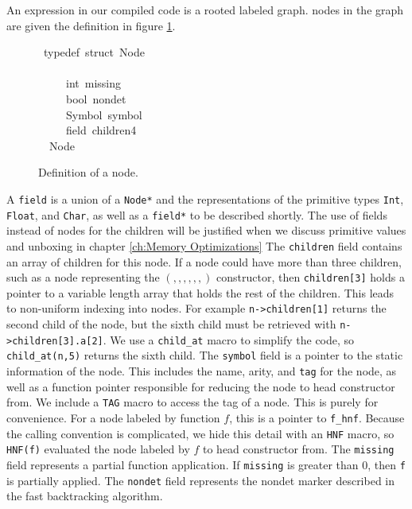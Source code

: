 \documentclass{book}
\theoremstyle{definition}
\newcommand{\Varid}[1]{\mathit{#1}}
\begin{document}
An expression in our compiled code is a rooted labeled graph.
nodes in the graph are given the definition in figure \ref{fig:node}.

\begin{figure}
\begin{tabbing}\ttfamily
~typedef~struct~Node\\
\ttfamily ~\\
\ttfamily ~~~~~int~missing\\
\ttfamily ~~~~~bool~nondet\\
\ttfamily ~~~~~Symbol~symbol\\
\ttfamily ~~~~~field~children4\\
\ttfamily ~~Node
\end{tabbing}
\caption{Definition of a node.}
\label{fig:node}
\end{figure}

A \texttt{field} is a union of a \texttt{Node*} and the representations
of the primitive types \texttt{Int}, \texttt{Float}, and \texttt{Char},
as well as a \texttt{field*} to be described shortly.
The use of fields instead of nodes for the children will be justified when we
discuss primitive values and unboxing in chapter \ref{ch:Memory Optimizations}
The \texttt{children} field contains an array of children for this node.
If a node could have more than three children, such as a node representing
the \ensuremath{(,,,,,,)} constructor, then \texttt{children[3]} holds a pointer
to a variable length array that holds the rest of the children.
This leads to non-uniform indexing into nodes.
For example \texttt{n->children[1]} returns the second child of the node,
but the sixth child must be retrieved with \texttt{n->children[3].a[2]}.
We use a \texttt{child\_at} macro to simplify the code,
so \texttt{child\_at(n,5)} returns the sixth child.
The \texttt{symbol} field is a pointer to the static information
of the node.
This includes the name, arity, and \texttt{tag} for the node,
as well as a function pointer responsible for reducing the node to 
head constructor from.
We include a \texttt{TAG} macro to access the tag of a node.
This is purely for convenience.
For a node labeled by function \ensuremath{\Varid{f}}, this is a pointer to \texttt{f\_hnf}.
Because the calling convention is complicated, we hide this detail with an
\texttt{HNF} macro, so \texttt{HNF(f)} evaluated the node labeled by \ensuremath{\Varid{f}}
to head constructor from.
The \texttt{missing} field represents a partial function application.
If \texttt{missing} is greater than 0, then \texttt f is partially applied.
The \texttt{nondet} field represents the nondet marker described in the
fast backtracking algorithm.
\end{document}
